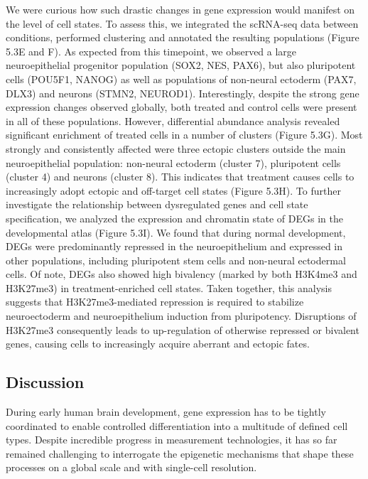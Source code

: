 We were curious how such drastic changes in gene expression would manifest on the level of cell states. To assess this, we integrated the scRNA-seq data between conditions, performed clustering and annotated the resulting populations (Figure 5.3E and F). As expected from this timepoint, we  observed a large neuroepithelial progenitor population (SOX2, NES, PAX6), but also pluripotent cells (POU5F1, NANOG) as well as populations of non-neural ectoderm (PAX7, DLX3) and neurons (STMN2, NEUROD1). Interestingly, despite the strong gene expression changes observed globally, both treated and control cells were present in all of these populations. However, differential abundance analysis revealed significant enrichment of treated cells in a number of clusters (Figure 5.3G). Most strongly and consistently affected were three ectopic clusters outside the main neuroepithelial population: non-neural ectoderm (cluster 7), pluripotent cells (cluster 4) and neurons (cluster 8). This indicates that treatment causes cells to increasingly adopt ectopic and off-target cell states (Figure 5.3H). To further investigate the relationship between dysregulated genes and cell state specification, we analyzed the expression and chromatin state of DEGs in the developmental atlas (Figure 5.3I). We found that during normal development, DEGs were predominantly repressed in the neuroepithelium and expressed in other populations, including pluripotent stem cells and non-neural ectodermal cells. Of note, DEGs also showed high bivalency (marked by both H3K4me3 and H3K27me3) in treatment-enriched cell states. Taken together, this analysis suggests that H3K27me3-mediated repression is required to stabilize neuroectoderm and neuroepithelium induction from pluripotency. Disruptions of H3K27me3 consequently leads to up-regulation of otherwise repressed or bivalent genes, causing cells to increasingly acquire aberrant and ectopic fates. 


\subsection{Discussion}
During early human brain development, gene expression has to be tightly coordinated to enable controlled differentiation into a multitude of defined cell types. Despite incredible progress in measurement technologies, it has so far remained challenging to interrogate the epigenetic mechanisms that shape these processes on a global scale and with single-cell resolution. 

